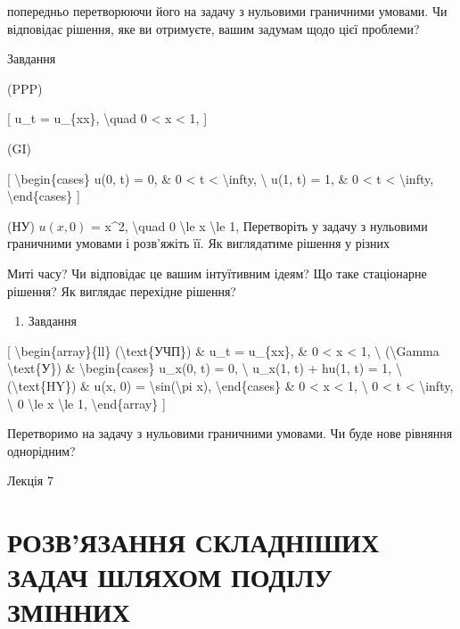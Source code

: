 \documentclass[
]{article}
\providecommand{\tightlist}{%
  \setlength{\itemsep}{0pt}\setlength{\parskip}{0pt}}
\begin{document}
попередньо перетворюючи його на задачу з нульовими граничними умовами.
Чи відповідає рішення, яке ви отримуєте, вашим задумам щодо цієї
проблеми?

Завдання

(PPP)

{[} u\_t = u\_\{xx\}, \textbackslash quad 0 \textless{} x \textless{} 1,
{]}

(GI)

{[} \textbackslash begin\{cases\} u(0, t) = 0, \& 0 \textless{} t
\textless{} \textbackslash infty, \textbackslash{} u(1, t) = 1, \& 0
\textless{} t \textless{} \textbackslash infty,
\textbackslash end\{cases\} {]}

(НУ) \(u(x, 0)\) = x\^{}2, \textbackslash quad 0 \textbackslash le x
\textbackslash le 1, Перетворіть у задачу з нульовими граничними умовами
і розв'яжіть її. Як виглядатиме рішення у різних

Миті часу? Чи відповідає це вашим інтуїтивним ідеям? Що таке стаціонарне
рішення? Як виглядає перехідне рішення?

\begin{enumerate}
\def\labelenumi{\arabic{enumi}.}
\setcounter{enumi}{2}
\tightlist
\item
  Завдання
\end{enumerate}

{[} \textbackslash begin\{array\}\{ll\} (\textbackslash text\{УЧП\}) \&
u\_t = u\_\{xx\}, \& 0 \textless{} x \textless{} 1, \textbackslash{}
(\textbackslash Gamma \textbackslash text\{У\}) \&
\textbackslash begin\{cases\} u\_x(0, t) = 0, \textbackslash{} u\_x(1,
t) + hu(1, t) = 1, \textbackslash{} (\textbackslash text\{HY\}) \& u(x,
0) = \textbackslash sin(\textbackslash pi x),
\textbackslash end\{cases\} \& 0 \textless{} x \textless{} 1,
\textbackslash{} 0 \textless{} t \textless{} \textbackslash infty,
\textbackslash{} 0 \textbackslash le x \textbackslash le 1,
\textbackslash end\{array\} {]}

Перетворимо на задачу з нульовими граничними умовами. Чи буде нове
рівняння однорідним?

Лекція 7

\section{РОЗВ'ЯЗАННЯ СКЛАДНІШИХ ЗАДАЧ ШЛЯХОМ ПОДІЛУ
ЗМІННИХ}\label{ux440ux43eux437ux432ux44fux437ux430ux43dux43dux44f-ux441ux43aux43bux430ux434ux43dux456ux448ux438ux445-ux437ux430ux434ux430ux447-ux448ux43bux44fux445ux43eux43c-ux43fux43eux434ux456ux43bux443-ux437ux43cux456ux43dux43dux438ux445}
\end{document}
